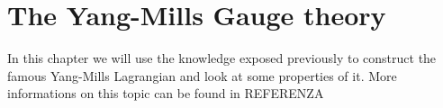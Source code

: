 \documentclass[12pt,a4paper]{report}
\theoremstyle{definition}
\theoremstyle{Theorem}
\theoremstyle{definition}
\theoremstyle{definition}
\begin{document}
\begin{comment}
			By uniqueness of the horizontal lift, $\mathcal{X}_{(p,g)}=\mathcal{X}_{(p,h)}$ and this proves right-invariance.\\
			\\
			As for the smoothness, we simply choose a trivializing chart on $M$ like $(U,\phi)$ and construct a trivialization 
			$$\varphi_U:\pi^{-1}(U)\rightarrow U\times G$$
			Now we define the vector field:
			$$Z_{(p,g)}=(X_p,0)\in T_{(p,g)}(U\times G)$$
			Clearly $Z$ is a smooth vector field on $U\times G$. Given the projection $\eta:U\times G\rightarrow U$ we have:
			$$d\eta Z_{(p,g)}=X_p$$
			To see this, note that $d\eta:T(U\times G)\rightarrow TU$ and so we get: $d\eta(Z)\in TU$ is a vector field. In particular, by definition of differential, we must have for any $(p,g)\in U\times G$:
			$$d\eta_{(p,g)}(Z_{(p,g)})f=Z_{(p,g)}(f\circ \eta_{(p,g)})$$
			And since $\eta$ projects the points from $U\times G$ to $U$, we get:
			$$d\eta_{(p,g)}(Z_{(p,g)})=X_p$$
			This implies that
			We can also define a smooth vector field on $\pi^{-1}(U)$ like:
			$$Y=d\varphi^{-1}(Z):U\times G \rightarrow T_{\pi^{-1}(U)}E$$
			For the same reason as before, given that $\pi$ is a projection, we must have:
			$$d\pi(Y_{(p,g)})=X_{\pi(p,g)}$$
			We know that the projection $Hor(Y)$ is smooth by hypothesis, If now we decompose $Y_{(p,g)}=\nu(Y_{(p,g)})+Hor(Y_{(p,g)})$ and apply the differential of the projection, recalling that $\mathcal{V}=Ker(d\pi)$, we get:
			$$d\pi(Y_{(p,g)})=d\pi(Hor(Y_{(p,g)}))=Hor(d\pi(Y_{(p,g)}))=X_{\pi(p,g)}$$
			This means that $Hor(Y)$ is the lift of $X$. By uniqueness, $X$ is smooth on $M$.
		\end{proof}
	\end{comment}
	\chapter{The Yang-Mills Gauge theory}
	In this chapter we will use the knowledge exposed previously to construct the famous Yang-Mills Lagrangian and look at some properties of it. More informations on this topic can be found in REFERENZA
\end{document}

